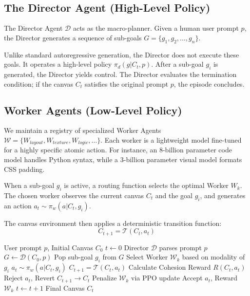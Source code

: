 \documentclass[pdflatex,sn-mathphys-num]{sn-jnl}
\begin{document}
\subsection{The Director Agent (High-Level Policy)}
The Director Agent $\mathcal{D}$ acts as the macro-planner. Given a human user prompt $p$, the Director generates a sequence of sub-goals $G = \{g_1, g_2, \dots, g_n\}$. 

Unlike standard autoregressive generation, the Director does not execute these goals. It operates a high-level policy $\pi_d(g | C_t, p)$. After a sub-goal $g_i$ is generated, the Director yields control. The Director evaluates the termination condition; if the canvas $C_t$ satisfies the original prompt $p$, the episode concludes.

\subsection{Worker Agents (Low-Level Policy)}
We maintain a registry of specialized Worker Agents $\mathcal{W} = \{W_{layout}, W_{texture}, W_{logic}, \dots\}$. Each worker is a lightweight model fine-tuned for a highly specific atomic action. For instance, an 8-billion parameter code model handles Python syntax, while a 3-billion parameter visual model formats CSS padding.

When a sub-goal $g_i$ is active, a routing function selects the optimal Worker $W_k$. The chosen worker observes the current canvas $C_t$ and the goal $g_i$, and generates an action $a_t \sim \pi_w(a | C_t, g_i)$. 

The canvas environment then applies a deterministic transition function:
\begin{equation}
    C_{t+1} = \mathcal{T}(C_t, a_t)
\end{equation}

\begin{algorithm}[htbp]
\caption{CMAC Hierarchical Generation Loop}
\begin{algorithmic}[1]
\REQUIRE User prompt $p$, Initial Canvas $C_0$
\STATE $t \leftarrow 0$
\STATE Director $\mathcal{D}$ parses prompt $p$
\STATE $G \leftarrow \mathcal{D}(C_0, p)$
    \STATE Pop sub-goal $g_i$ from $G$
    \STATE Select Worker $\mathcal{W}_k$ based on modality of $g_i$
    \STATE $a_t \sim \pi_w(a | C_t, g_i)$
    \STATE $C_{t+1} = \mathcal{T}(C_t, a_t)$
    \STATE Calculate Cohesion Reward $R(C_t, a_t)$
        \STATE Reject $a_t$, Revert $C_{t+1} \rightarrow C_t$
        \STATE Penalize $\mathcal{W}_k$ via PPO update
    \ELSE
        \STATE Accept $a_t$, Reward $\mathcal{W}_k$
        \STATE $t \leftarrow t + 1$
    \ENDIF
\ENDWHILE
\RETURN Final Canvas $C_t$
\end{algorithmic}
\end{algorithm}
\end{document}

